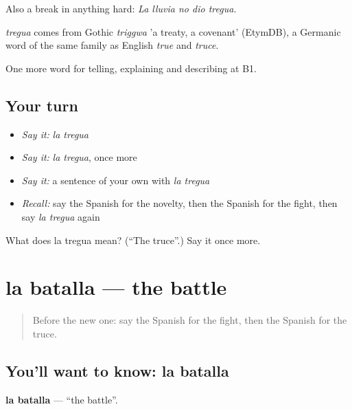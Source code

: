 Also a break in anything hard: \emph{La lluvia no dio tregua.}

\begin{cousinweb}
\emph{tregua} comes from Gothic \emph{triggwa} 'a treaty, a covenant' (EtymDB), a Germanic word of the same family as English \emph{true} and \emph{truce}.
\end{cousinweb}

\begin{grammarlens}[title={What you've built}]
One more word for telling, explaining and describing at B1.
\end{grammarlens}

\subsection*{Your turn}
\begin{itemize}
\raggedright
  \item \emph{Say it:} \emph{la tregua}
  \item \emph{Say it:} \emph{la tregua}, once more
  \item \emph{Say it:} a sentence of your own with \emph{la tregua}
  \item \emph{Recall:} say the Spanish for the novelty, then the Spanish for the fight, then say \emph{la tregua} again
\end{itemize}

\begin{tcolorbox}[breakable,colback=teal!4,colframe=teal!35!black,title={Before you move on}]
What does la tregua mean? (\textquotedblleft{}The truce\textquotedblright{}.) Say it once more.
\end{tcolorbox}
\section[la batalla]{la batalla — the battle}

\label{lesson:ES-C567-batalla}



\begin{quote}
Before the new one: say the Spanish for the fight, then the Spanish for the truce.
\end{quote}

\subsection*{You'll want to know: la batalla}
\textbf{la batalla} — \textquotedblleft{}the battle\textquotedblright{}.

